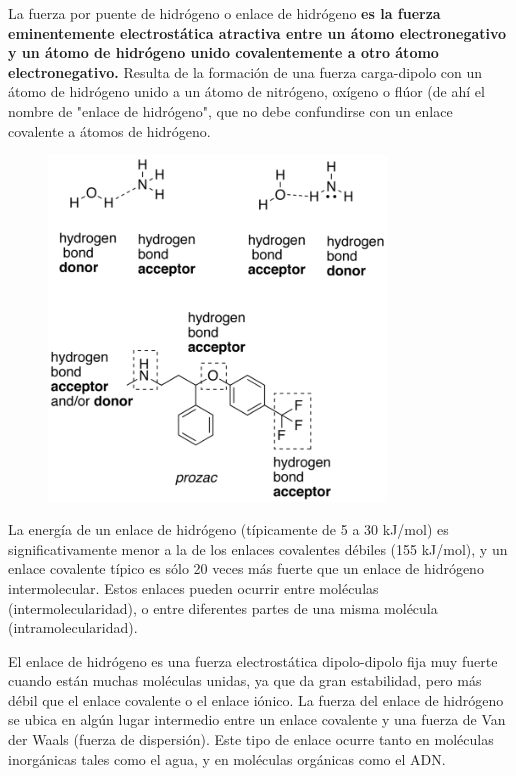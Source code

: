 \documentclass{article}
\begin{document}
La fuerza por puente de hidrógeno o enlace de hidrógeno \textbf{es la fuerza eminentemente electrostática atractiva entre un átomo electronegativo y un átomo de hidrógeno unido covalentemente a otro átomo electronegativo.} Resulta de la formación de una fuerza carga-dipolo con un átomo de hidrógeno unido a un átomo de nitrógeno, oxígeno o flúor (de ahí el nombre de "enlace de hidrógeno", que no debe confundirse con un enlace covalente a átomos de hidrógeno. \cite{Kittel}


\begin{figure}[h]
    \centering
    \includegraphics[width=0.8\textwidth]{Enlace_de_Hidrogeno_2.png}
    
    \label{Figura 1}
\end{figure}

La energía de un enlace de hidrógeno (típicamente de 5 a 30 kJ/mol) es significativamente menor a la de los enlaces covalentes débiles (155 kJ/mol), y un enlace covalente típico es sólo 20 veces más fuerte que un enlace de hidrógeno intermolecular. Estos enlaces pueden ocurrir entre moléculas (intermolecularidad), o entre diferentes partes de una misma molécula (intramolecularidad). 

El enlace de hidrógeno es una fuerza electrostática dipolo-dipolo fija muy fuerte cuando están muchas moléculas unidas, ya que da gran estabilidad, pero más débil que el enlace covalente o el enlace iónico. La fuerza del enlace de hidrógeno se ubica en algún lugar intermedio entre un enlace covalente y una fuerza de Van der Waals (fuerza de dispersión). Este tipo de enlace ocurre tanto en moléculas inorgánicas tales como el agua, y en moléculas orgánicas como el ADN.
\end{document}
